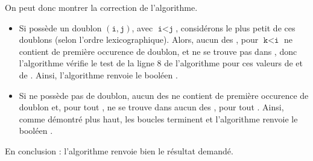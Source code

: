 On peut donc montrer la correction de l'algorithme. 
\begin{itemize}
  \item Si  possède un doublon $(\texttt{i},\texttt{j})$, avec $\texttt{i}<\texttt{j}$, considérons le plus petit de ces doublons (selon l'ordre lexicographique). 
    Alors, aucun des , pour $\texttt{k}<\texttt{i}$ ne contient de première occurence de doublon, et  ne se trouve pas dans , donc l'algorithme vérifie le test de la ligne 8 de l'algorithme pour ces valeurs de  et de . 
    Ainsi, l'algorithme renvoie le booléen .
  \item Si  ne possède pas de doublon, aucun des  ne contient de première occurence de doublon et, pour tout ,  ne se trouve dans aucun des  , pour tout . 
    Ainsi, comme démontré plus haut, les boucles terminent et l'algorithme renvoie le booléen .
\end{itemize}
En conclusion : l'algorithme renvoie bien le résultat demandé.